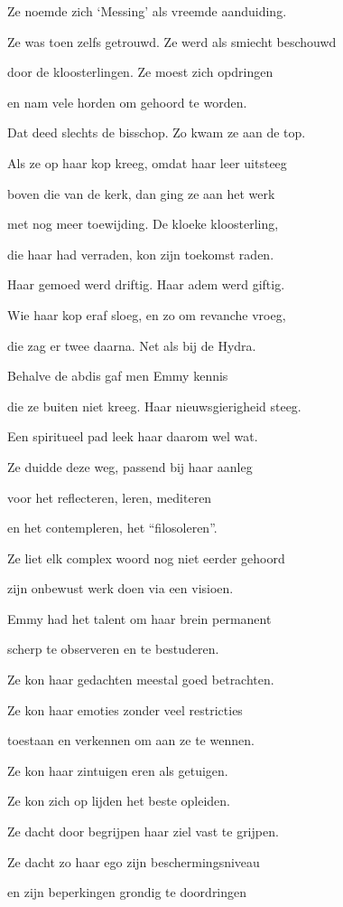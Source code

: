 Ze noemde zich ‘Messing’
als vreemde aanduiding.

Ze was toen zelfs getrouwd.
Ze werd als smiecht beschouwd

door de kloosterlingen.
Ze moest zich opdringen

en nam vele horden
om gehoord te worden.

Dat deed slechts de bisschop.
Zo kwam ze aan de top.

Als ze op haar kop kreeg,
omdat haar leer uitsteeg

boven die van de kerk,
dan ging ze aan het werk

met nog meer toewijding.
De kloeke kloosterling,

die haar had verraden,
kon zijn toekomst raden.

Haar gemoed werd driftig.
Haar adem werd giftig.

Wie haar kop eraf sloeg,
en zo om revanche vroeg,

die zag er twee daarna.
Net als bij de Hydra.

Behalve de abdis
gaf men Emmy kennis

die ze buiten niet kreeg.
Haar nieuwsgierigheid steeg.

Een spiritueel pad
leek haar daarom wel wat.

Ze duidde deze weg,
passend bij haar aanleg

voor het reflecteren,
leren, mediteren

en het contempleren,
het “filosoleren”.

Ze liet elk complex woord
nog niet eerder gehoord

zijn onbewust werk doen
via een visioen.

Emmy had het talent
om haar brein permanent

scherp te observeren
en te bestuderen.

Ze kon haar gedachten
meestal goed betrachten.

Ze kon haar emoties
zonder veel restricties

toestaan en verkennen
om aan ze te wennen.

Ze kon haar zintuigen
eren als getuigen.

Ze kon zich op lijden
het beste opleiden.

Ze dacht door begrijpen
haar ziel vast te grijpen.

Ze dacht zo haar ego
zijn beschermingsniveau

en zijn beperkingen
grondig te doordringen

